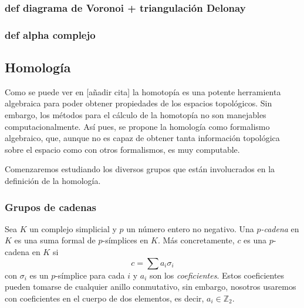 \subsubsection*{def diagrama de Voronoi + triangulación Delonay}
\subsubsection*{def alpha complejo}

\subsection{Homología}
Como se puede ver en [añadir cita] la homotopía es una potente herramienta algebraica para poder obtener propiedades de los espacios topológicos. Sin embargo, los métodos para el cálculo de la homotopía no son manejables computacionalmente. Así pues, se propone la homología como formalismo algebraico, que, aunque no es capaz de obtener tanta información topológica sobre el espacio como con otros formalismos, es muy computable.

Comenzaremos estudiando los diversos grupos que están involucrados en la definición de la homología.

\subsubsection*{Grupos de cadenas}
Sea $K$ un complejo simplicial y $p$ un número entero no negativo. Una \emph{$p$-cadena} en $K$ es una suma formal de $p$-símplices en $K$. Más concretamente, $c$ es una $p$-cadena en $K$ si
\[
c = \sum a_i\sigma_i
\]
con $\sigma_i$ es un $p$-símplice para cada $i$ y $a_i$ son los \emph{coeficientes}. Estos coeficientes pueden tomarse de cualquier anillo conmutativo, sin embargo, nosotros usaremos con coeficientes en el cuerpo de dos elementos, es decir, $a_i \in \mathbb{Z}_2$. 

